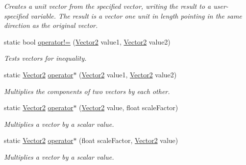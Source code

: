 \begin{DoxyCompactItemize}
\begin{DoxyCompactList}\small\item\em Creates a unit vector from the specified vector, writing the result to a user-\/specified variable. The result is a vector one unit in length pointing in the same direction as the original vector.\end{DoxyCompactList}\item 
static bool \hyperlink{structMicrosoft_1_1Xna_1_1Framework_1_1Vector2_ac4ba7b463e73092e96f446813fd68317}{operator!=} (\hyperlink{structMicrosoft_1_1Xna_1_1Framework_1_1Vector2}{Vector2} value1, \hyperlink{structMicrosoft_1_1Xna_1_1Framework_1_1Vector2}{Vector2} value2)
\begin{DoxyCompactList}\small\item\em Tests vectors for inequality.\end{DoxyCompactList}\item 
static \hyperlink{structMicrosoft_1_1Xna_1_1Framework_1_1Vector2}{Vector2} \hyperlink{structMicrosoft_1_1Xna_1_1Framework_1_1Vector2_ae2fe981b42c04d2bdd8c3c370f041062}{operator$\ast$} (\hyperlink{structMicrosoft_1_1Xna_1_1Framework_1_1Vector2}{Vector2} value1, \hyperlink{structMicrosoft_1_1Xna_1_1Framework_1_1Vector2}{Vector2} value2)
\begin{DoxyCompactList}\small\item\em Multiplies the components of two vectors by each other.\end{DoxyCompactList}\item 
static \hyperlink{structMicrosoft_1_1Xna_1_1Framework_1_1Vector2}{Vector2} \hyperlink{structMicrosoft_1_1Xna_1_1Framework_1_1Vector2_a3d4d019b5e30e1892368cdaf73af3464}{operator$\ast$} (\hyperlink{structMicrosoft_1_1Xna_1_1Framework_1_1Vector2}{Vector2} value, float scale\+Factor)
\begin{DoxyCompactList}\small\item\em Multiplies a vector by a scalar value.\end{DoxyCompactList}\item 
static \hyperlink{structMicrosoft_1_1Xna_1_1Framework_1_1Vector2}{Vector2} \hyperlink{structMicrosoft_1_1Xna_1_1Framework_1_1Vector2_a0cc04a1704e1af7354cfe9454f3951e1}{operator$\ast$} (float scale\+Factor, \hyperlink{structMicrosoft_1_1Xna_1_1Framework_1_1Vector2}{Vector2} value)
\begin{DoxyCompactList}\small\item\em Multiplies a vector by a scalar value.\end{DoxyCompactList}\item 

\end{DoxyCompactItemize}
